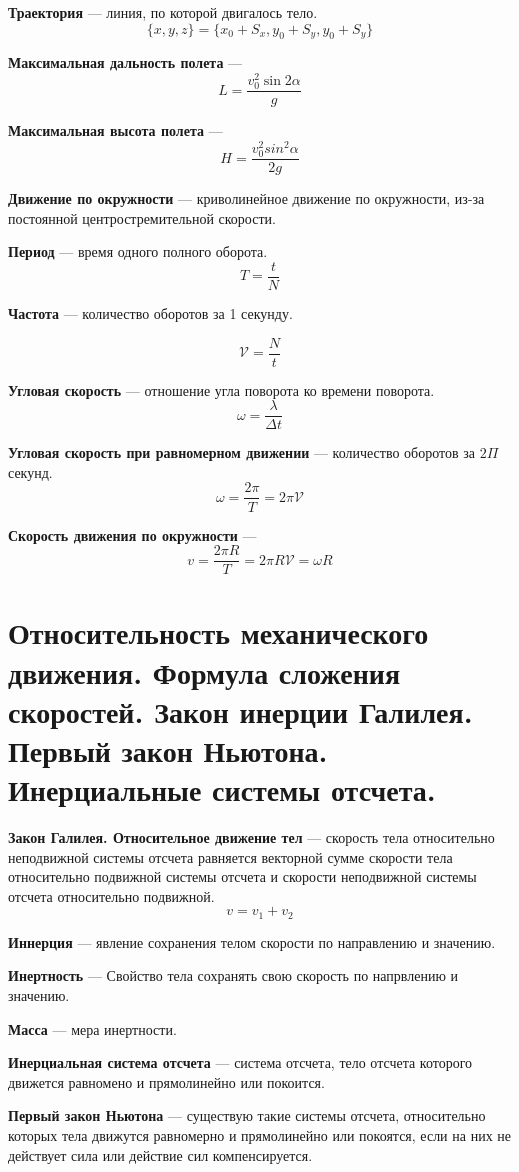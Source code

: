 \documentclass{report}
\begin{document}
{\bf Траектория} —
линия, по которой двигалось тело.
$$
\{x,y,z\}=\{x_0+S_x, y_0+S_y, y_0+S_y\}
$$

{\bf Максимальная дальность полета} —
$$
L=\frac{v^2_0\sin{2\alpha}}{g}
$$

{\bf Максимальная высота полета} —
$$
H=\frac{v^2_0sin^2{\alpha}}{2g}
$$

{\bf Движение по окружности} —
криволинейное движение по окружности, из-за постоянной центростремительной скорости.

{\bf Период} —
время одного полного оборота.
$$
T=\frac{t}{N}
$$

{\bf Частота} —
количество оборотов за 1 секунду.

$$
\mathcal{V} = \frac{N}{t}
$$

{\bf Угловая скорость} —
отношение угла поворота ко времени поворота.
$$
\omega =\frac{\lambda}{\Delta t}
$$

{\bf Угловая скорость при равномерном движении} —
количество оборотов за $2\Pi$ секунд.
$$
\omega =\frac{2\pi}{T}=2\pi \mathcal{V}
$$

{\bf Скорость движения по окружности} —
$$
v=\frac{2\pi R}{T}=2\pi R \mathcal{V} = \omega R
$$

\part{Относительность механического движения. 
Формула сложения скоростей. 
Закон инерции Галилея. 
Первый закон Ньютона. 
Инерциальные системы отсчета. }

{\bf Закон Галилея. Относительное движение тел} —
скорость тела относительно неподвижной системы отсчета равняется векторной сумме скорости тела относительно подвижной системы отсчета и скорости неподвижной системы отсчета относительно подвижной.
$$
v=v_1+v_2
$$

{\bf Иннерция} —
явление сохранения телом скорости по направлению и значению.

{\bf Инертность} —
Свойство тела сохранять свою скорость по напрвлению и значению.

{\bf Масса} —
мера инертности.

{\bf Инерциальная система отсчета} —
система отсчета, тело отсчета которого движется равномено и прямолинейно или покоится.

{\bf Первый закон Ньютона} —
существую такие системы отсчета, относительно которых тела движутся равномерно и прямолинейно или 
покоятся, если на них не действует сила или действие сил компенсируется.
\end{document}

